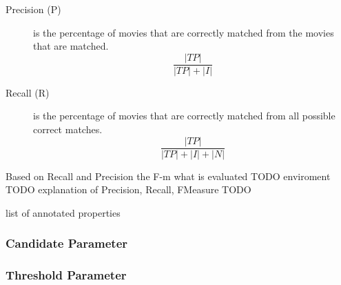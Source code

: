 \begin{description}
\item[Precision (P)] is the percentage of movies that are correctly matched from the movies that are matched.
\begin{equation}
\frac
{\left\lvert TP \right\rvert}
{\left\lvert TP \right\rvert + \left\lvert I \right\rvert}
\end{equation}
\item[Recall (R)] is the percentage of movies that are correctly matched from all possible correct matches.
\begin{equation}
\frac
{\left\lvert TP \right\rvert}
{\left\lvert TP \right\rvert + \left\lvert I \right\rvert + \left\lvert N \right\rvert}
\end{equation}
\end{description}

Based on Recall and Precision the F-m
what is evaluated TODO
enviroment TODO
explanation of Precision, Recall, FMeasure TODO

list of annotated properties 

\subsubsection{Candidate Parameter}
\subsubsection{Threshold Parameter}